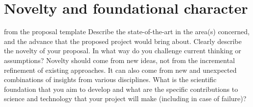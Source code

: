 \section{Novelty and foundational character}\label{sec:progress}
\begin{todo}{from the proposal template}
  Describe the state-of-the-art in the area(s) concerned, and the advance that the
  proposed project would bring about. Clearly describe the novelty of your proposal. In
  what way do you challenge current thinking or assumptions? Novelty should come from new
  ideas, not from the incremental refinement of existing approaches. It can also come from
  new and unexpected combinations of insights from various disciplines. What is the
  scientific foundation that you aim to develop and what are the specific contributions to
  science and technology that your project will make (including in case of failure)?
\end{todo}

